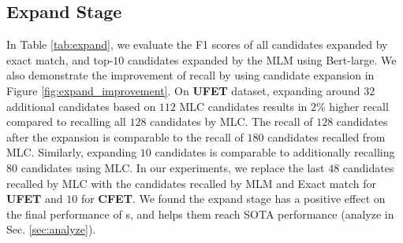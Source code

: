 \subsection{Expand Stage}
\label{sec:expand}
In Table \ref{tab:expand}, we evaluate the F1 scores of all candidates expanded by exact match, and top-$10$ candidates expanded by the MLM using Bert-large. We also demonstrate the improvement of recall by using candidate expansion in Figure \ref{fig:expand_improvement}. On {\bf \textsc{UFET}} dataset, expanding around $32$ additional candidates based on $112$ MLC candidates results in $2\%$ higher recall compared to recalling all $128$ candidates by MLC. The recall of $128$ candidates after the expansion is comparable to the recall of $180$ candidates recalled from MLC. Similarly, expanding $10$ candidates is comparable to additionally recalling $80$ candidates using MLC.
In our experiments, we replace the last $48$ candidates recalled by MLC with the candidates recalled by MLM and Exact match for {\bf \textsc{UFET}} and $10$ for {\bf \textsc{CFET}}. We found the expand stage has a positive effect on the final performance of {\bf \textsc{\name}}s, and helps them reach SOTA performance (analyze in Sec. \ref{sec:analyze}).


